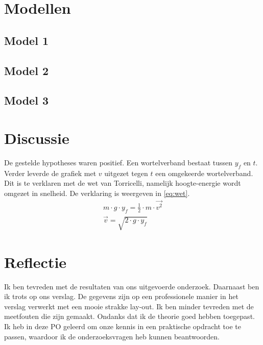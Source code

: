 \documentclass[numbers=endperiod]{scrartcl}
\begin{document}
\section{Modellen}
\subsection{Model 1}
\subsection{Model 2}
\subsection{Model 3}

\section{Discussie}
De gestelde hypotheses waren positief. Een wortelverband bestaat tussen $y_f$ en $t$. Verder leverde de grafiek met $v$ uitgezet tegen $t$ een omgekeerde wortelverband. Dit is te verklaren met de wet van Torricelli, namelijk hoogte-energie wordt omgezet in snelheid. De verklaring is weergeven in \cref{eq:wet}.
\begin{equation}\label{eq:wet}
\begin{split}
m \cdot g \cdot y_f = \frac{1}{2} \cdot m \cdot \vec{v^2}\\
\vec{v} = \sqrt{2 \cdot g \cdot y_f}
\end{split}
\end{equation}

\section{Reflectie}
Ik ben tevreden met de resultaten van ons uitgevoerde onderzoek. Daarnaast
ben ik trots op ons verslag. De gegevens zijn op een professionele
manier in het verslag verwerkt met een mooie strakke lay-out. Ik ben minder
tevreden met de meetfouten die zijn gemaakt. Ondanks dat ik de theorie
goed hebben toegepast. Ik heb in deze PO geleerd om onze kennis in
een praktische opdracht toe te passen, waardoor ik de onderzoeksvragen
heb kunnen beantwoorden.


\newpage
\appendix
\end{document}
